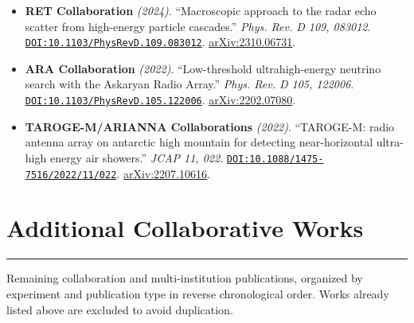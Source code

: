 \documentclass[10pt]{article}
\newcommand{\doi}[1]{{\urlstyle{tt}\href{https://doi.org/#1}{\nolinkurl{DOI:#1}}}.}
\newcommand{\arxiv}[1]{\href{https://arxiv.org/abs/#1}{arXiv:#1}.}
\begin{document}
\begin{itemize}
    \item \textbf{RET Collaboration} \textit{(2024)}. ``Macroscopic approach to the radar echo scatter from high-energy particle cascades.'' \textit{Phys. Rev. D 109, 083012}. \doi{10.1103/PhysRevD.109.083012} \arxiv{2310.06731}
    \item \textbf{ARA Collaboration} \textit{(2022)}. ``Low-threshold ultrahigh-energy neutrino search with the Askaryan Radio Array.'' \textit{Phys. Rev. D 105, 122006}. \doi{10.1103/PhysRevD.105.122006} \arxiv{2202.07080}
    \item \textbf{TAROGE-M/ARIANNA Collaborations} \textit{(2022)}. ``TAROGE-M: radio antenna array on antarctic high mountain for detecting near-horizontal ultra-high energy air showers.'' \textit{JCAP 11, 022}. \doi{10.1088/1475-7516/2022/11/022} \arxiv{2207.10616}
\end{itemize}

\section{Additional Collaborative Works}
\vspace{3pt}
\hrule
\vspace{4pt}

Remaining collaboration and multi-institution publications, organized by experiment and publication type in reverse chronological order. Works already listed above are excluded to avoid duplication.

\begingroup\RaggedRight\sloppy

\endgroup
\end{document}
